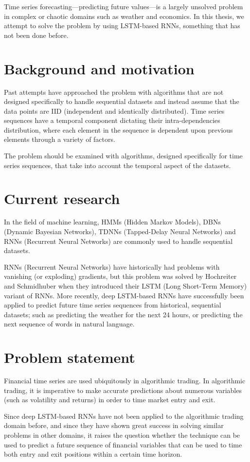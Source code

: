 Time series forecasting---predicting future values---is a largely unsolved problem in complex or chaotic domains such as weather and economics. In this thesis, we attempt to solve the problem by using LSTM-based RNNs, something that has not been done before.

\section{Background and motivation}
Past attempts have approached the problem with algorithms that are not designed specifically to handle sequential datasets and instead assume that the data points are IID (independent and identically distributed). Time series sequences have a temporal component dictating their intra-dependencies distribution, where each element in the sequence is dependent upon previous elements through a variety of factors.

The problem should be examined with algorithms, designed specifically for time series sequences, that take into account the temporal aspect of the datasets.

\section{Current research}
In the field of machine learning, HMMs (Hidden Markov Models), DBNs (Dynamic Bayesian Networks), TDNNs (Tapped-Delay Neural Networks) and RNNs (Recurrent Neural Networks) are commonly used to handle sequential datasets.

RNNs (Recurrent Neural Networks) have historically had problems with vanishing (or exploding) gradients, but this problem was solved by Hochreiter and Schmidhuber when they introduced their LSTM (Long Short-Term Memory) variant of RNNs. More recently, deep LSTM-based RNNs have successfully been applied to predict future time series sequences from historical, sequential datasets; such as predicting the weather for the next 24 hours, or predicting the next sequence of words in natural language.

\newpage
\section{Problem statement}
Financial time series are used ubiquitously in algorithmic trading. In algorithmic trading, it is imperative to make accurate predictions about numerous variables (such as volatility and returns) in order to time market entry and exit.

Since deep LSTM-based RNNs have not been applied to the algorithmic trading domain before, and since they have shown great success in solving similar problems in other domains, it raises the question whether the technique can be used to predict a future sequence of financial variables that can be used to time both entry and exit positions within a certain time horizon.

